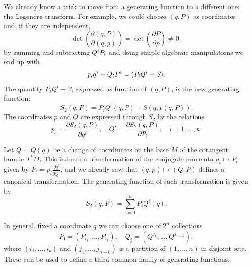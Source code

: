 \documentclass[english,fontsize=11pt,paper=a5,oneside]{scrbook}
\let\d\relax
\newcommand{\d}{\mathrm{d}}
\theoremstyle{definition}
\newenvironment{example}
  {\pushQED{\qed}\renewcommand{\qedsymbol}{$\lozenge$}\examplex}
  {\popQED\endexamplex}
\begin{document}
We already know a trick to move from a generating function to a different one: the Legendre transform.
For example, we could choose $(q,P)$ as coordinates and, if they are independent,
\begin{equation}
  \det\left( \frac{\partial(q,P)}{\partial(q,p)}\right) = \det\left( \frac{\partial P}{\partial p} \right)\neq 0,
\end{equation}
by summing and subtracting $Q^i\d P_i$ and doing simple algebraic manipulations we end up with
\begin{equation}
  p_i \d q^i + Q_i \d P^i = \d (P_iQ^i + S).
\end{equation}
The quantity $P_iQ^i + S$, expressed as function of $(q,P)$, is the new generating function:
\begin{equation}
  S_2(q,P) = P_i Q^i(q,P) + S(q, p(q,P)).
\end{equation}
The coordinates $p$ and $Q$ are expressed through $S_2$ by the relations
\begin{equation}\label{eq:coordgenfun2}
  p_i = \frac{\partial S_2(q,P)}{\partial q^i},\quad
  Q^i = \frac{\partial S_2(q,P)}{\partial P_i},\quad
  i=1,\ldots,n.
\end{equation}

\begin{example}
  Let $Q=Q(q)$ be a change of coordinates on the base $M$ of the cotangent bundle $T^*M$.
  This induces a transformation of the conjugate momenta $p_i\mapsto P_i$ given by $P_i = p_l \frac{\partial q^l}{\partial Q^i}$, and we already saw that $(q,p)\mapsto(Q,P)$ defines a canonical transformation.
  The generating function of such transformation is given by
  \begin{equation}
    S_2(q,P) = \sum_{i=1}^n P_i Q^i(q).
  \end{equation}
\end{example}

In general, fixed a coordinate $q$ we can choose one of $2^n$ collections
\begin{equation}\label{eq:PQcollection}
  P_{\bm{i}} = (P_{i_1}, \ldots, P_{i_k}), \quad
  Q_{\bm{j}} = (Q^{j_1}, \ldots, Q^{j_{n-k}}),
\end{equation}
where $(i_1, \ldots, i_k)$ and $(j_1, \ldots, j_{n-k})$ is a partition of $(1,\ldots,n)$ in disjoint sets.
These can be used to define a third common family of generating functions.
\end{document}
